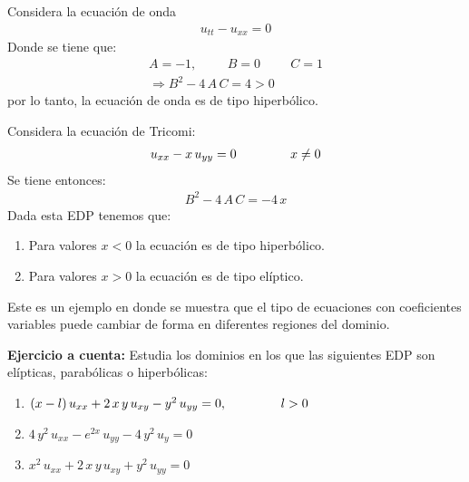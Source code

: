 \begin{ejemplo}
Considera la ecuación de onda
\begin{align*}
u_{tt} - u_{xx} = 0
\end{align*}
Donde se tiene que:
\begin{align*}
A = -1, \hspace{1cm} B = 0 \hspace{1cm} C = 1 \\
\Rightarrow B^{2} - 4 \, A \, C = 4 > 0
\end{align*}
por lo tanto, la ecuación de onda es de tipo hiperbólico.
\end{ejemplo}
\begin{ejemplo}
Considera la ecuación de Tricomi:
\begin{align*}
u_{xx} - x \, u_{yy} = 0 \hspace{1.5cm} x \neq 0
\end{align*}
Se tiene entonces:
\begin{align*}
B^{2} - 4 \, A \, C = - 4 \, x
\end{align*}
Dada esta EDP tenemos que:
\begin{enumerate}
\item Para valores $x < 0$ la ecuación es de tipo hiperbólico.
\item Para valores $x > 0$ la ecuación es de tipo elíptico.
\end{enumerate}
Este es un ejemplo en donde se muestra que el tipo de ecuaciones con coeficientes variables puede cambiar de forma en diferentes regiones del dominio.
\end{ejemplo}
\textbf{Ejercicio a cuenta: } Estudia los dominios en los que las siguientes EDP son elípticas, parabólicas o hiperbólicas:
\begin{enumerate}[label=(\roman*)]
\item $(x - l) \, u_{x x} + 2 \, x \, y \, u_{x y} - y^{2} \, u_{y y } = 0, \hspace{1.5cm} l > 0$
\item $4 \, y^{2} \, u_{x x} - e^{2 x} \, u_{y y} - 4 \, y^{2} \, u_{y} = 0$
\item $x^{2} \, u_{x x} + 2 \, x \, y \, u_{x y} + y^{2} \, u_{y y} = 0$
\end{enumerate}
